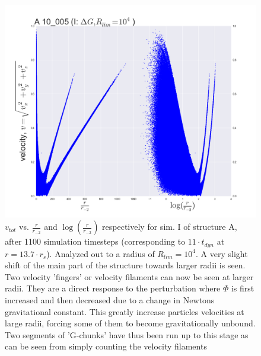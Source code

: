 \begin{figure}[!htbp]
\centering
\includegraphics[width=1.0\linewidth]{img/A_10_005_v_logr_r2.png}
\caption{$v_{tot}$ vs. $\frac{r}{r_{-2}}$ and $\log (\frac{r}{r_{-2}})$ respectively for sim. I of structure A, after 1100 simulation timesteps (corresponding to $11\cdot t_{dyn}$ at $r=13.7\cdot r_s$). Analyzed out to a radius of $R_{lim} = 10^4$. A very slight shift of the main part of the structure towards larger radii is seen. Two velocity 'fingers' or velocity filaments can now be seen at larger radii. They are a direct response to the perturbation where $\Phi$ is first increased and then decreased due to a change in Newtons gravitational constant. This greatly increase particles velocities at large radii, forcing some of them to become gravitationally unbound. Two segments of 'G-chunks' have thus been run up to this stage as can be seen from simply counting the velocity filaments}
\label{fig:test}
\end{figure}

